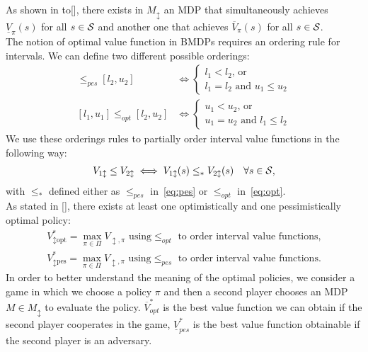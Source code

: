 As shown in to[\cite{givan2000bounded}], there exists in $M_{\updownarrow}$ an \ac{MDP} that simultaneously achieves $\underline{V}_{\pi}(s)$ for all $s \in \mathcal{S}$ and another one that achieves $\overline{V}_{\pi}(s)$ for all $s \in \mathcal{S}$.\\
\newline
The notion of optimal value function in \ac{BMDP}s requires an ordering rule for intervals. We can define two different possible orderings:
\begin{align}
[l_1, u_1] \leq_{pes} [l_2, u_2] &\Leftrightarrow 
\begin{cases}
l_1 < l_2 \text{, or }\\
l_1 = l_2 \text{ and } u_1 \leq u_2
\end{cases} \label{eq:pes}\\
[l_1, u_1] \leq_{opt} [l_2, u_2] &\Leftrightarrow 
\begin{cases}
u_1 < u_2 \text{, or }\\
u_1 = u_2 \text{ and } l_1 \leq l_2
\end{cases} \label{eq:opt}
\end{align}
We use these orderings rules to partially order interval value functions in the following way:
\begin{align} V_{1 \updownarrow} \leq V_{2 \updownarrow} \iff V_{1 \updownarrow}(s) \leq_{*} V_{2 \updownarrow}(s) \quad \forall s \in \mathcal{S}, \end{align}
with $\leq_{*}$ defined either as $\leq_{pes}$ in~\eqref{eq:pes} or $\leq_{opt}$ in~\eqref{eq:opt}.\\
\newline
As stated in [\cite{givan2000bounded}], there exists at least one optimistically and one pessimistically optimal policy:
\begin{align*}
V^{*}_{\updownarrow \text{opt}} = \max_{\pi \in \Pi} V_{\updownarrow, \pi} \text{ using} \leq_{opt} \text{ to order interval value functions,}\\
V^{*}_{\updownarrow \text{pes}} = \max_{\pi \in \Pi} V_{\updownarrow, \pi} \text{ using} \leq_{pes} \text{ to order interval value functions.}
\end{align*}
In order to better understand the meaning of the optimal policies, we consider a game in which we choose a policy $\pi$ and then a second player chooses an \ac{MDP} $M \in M_{\updownarrow}$ to evaluate the policy. $\overline{V}^{*}_{opt}$ is the best value function we can obtain if the second player cooperates in the game, $\underline{V}^{*}_{pes}$ is the best value function obtainable if the second player is an adversary.\\
